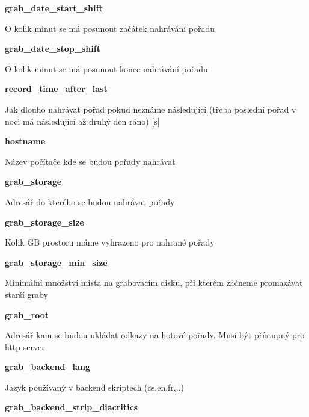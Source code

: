 \vspace{10pt}

\textbf{grab\_date\_start\_shift}

O kolik minut se má posunout začátek nahrávání pořadu

\vspace{10pt}

\textbf{grab\_date\_stop\_shift}

O kolik minut se má posunout konec nahrávání pořadu

\vspace{10pt}

\textbf{record\_time\_after\_last}

Jak dlouho nahrávat pořad pokud neznáme následující (třeba poslední pořad v noci má následující až druhý den ráno) [s]

\vspace{10pt}

\textbf{hostname}

Název počítače kde se budou pořady nahrávat

\vspace{10pt}

\textbf{grab\_storage}

Adresář do kterého se budou nahrávat pořady

\vspace{10pt}

\textbf{grab\_storage\_size}

Kolik GB prostoru máme vyhrazeno pro nahrané pořady

\vspace{10pt}

\textbf{grab\_storage\_min\_size}

Minimální množství místa na grabovacím disku, při kterém začneme promazávat starší graby

\vspace{10pt}

\textbf{grab\_root}

Adresář kam se budou ukládat odkazy na hotové pořady. Musí být přístupný pro http server

\vspace{10pt}

\textbf{grab\_backend\_lang}

Jazyk používaný v backend skriptech (cs,en,fr,..)

\vspace{10pt}

\textbf{grab\_backend\_strip\_diacritics}

